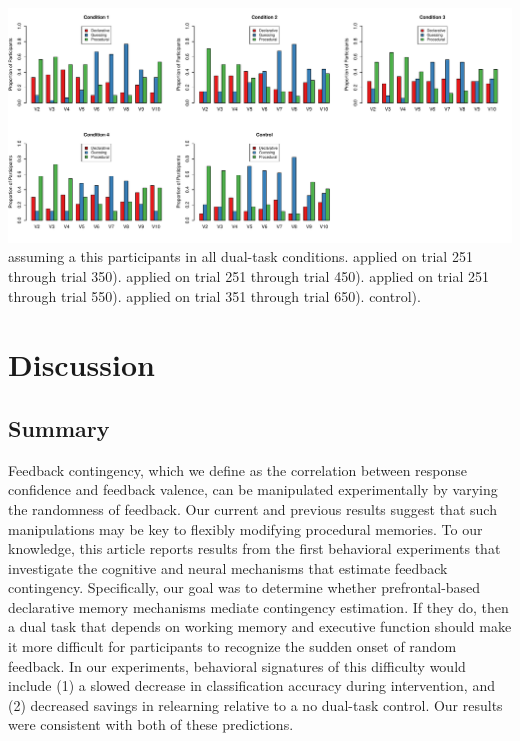 \documentclass[man,apacite,draftfirst]{apa6} \usepackage{amsmath}
\begin{document}
\centering \includegraphics[width=1.0\textwidth]{../figures/fig_model_fits.pdf}
assuming a %
this %
participants in all dual-task conditions. %
applied on trial 251 through trial 350). %
applied on trial 251 through trial 450). %
applied on trial 251 through trial 550). %
applied on trial 351 through trial 650). %
control). %

\section*{Discussion}
\subsection*{Summary}
Feedback contingency, which we define as the correlation between response
confidence and feedback valence, can be manipulated experimentally by varying
the randomness of feedback. Our current and previous results
\cite{crossley_erasing_2013} suggest that such manipulations may be key to
flexibly modifying procedural memories. To our knowledge, this article reports
results from the first behavioral experiments that investigate the cognitive and
neural mechanisms that estimate feedback contingency. Specifically, our goal was
to determine whether prefrontal-based declarative memory mechanisms mediate
contingency estimation. If they do, then a dual task that depends on working
memory and executive function should make it more difficult for participants to
recognize the sudden onset of random feedback. In our experiments, behavioral
signatures of this difficulty would include (1) a slowed decrease in
classification accuracy during intervention, and (2) decreased savings in
relearning relative to a no dual-task control. Our results were consistent with
both of these predictions.
\end{document}
